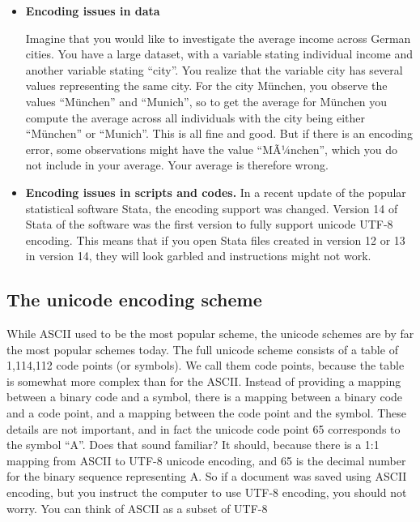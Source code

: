 \documentclass[
]{book}
\begin{document}
\begin{itemize}
\item
  \textbf{Encoding issues in data}

  Imagine that you would like to investigate the average income across German cities. You have a large dataset, with a variable stating individual income and another variable stating ``city''. You realize that the variable city has several values representing the same city. For the city München, you observe the values ``München'' and ``Munich'', so to get the average for München you compute the average across all individuals with the city being either ``München'' or ``Munich''. This is all fine and good. But if there is an encoding error, some observations might have the value ``MÃ¼nchen'', which you do not include in your average. Your average is therefore wrong.
\item
  \textbf{Encoding issues in scripts and codes.}
  In a recent update of the popular statistical software Stata, the encoding support was changed. Version 14 of Stata of the software was the first version to fully support unicode UTF-8 encoding. This means that if you open Stata files created in version 12 or 13 in version 14, they will look garbled and instructions might not work.
\end{itemize}

\hypertarget{the-unicode-encoding-scheme}{%
\subsection*{The unicode encoding scheme}\label{the-unicode-encoding-scheme}}

While ASCII used to be the most popular scheme, the unicode schemes are by far the most popular schemes today. The full unicode scheme consists of a table of 1,114,112 code points (or symbols). We call them code points, because the table is somewhat more complex than for the ASCII. Instead of providing a mapping between a binary code and a symbol, there is a mapping between a binary code and a code point, and a mapping between the code point and the symbol. These details are not important, and in fact the unicode code point 65 corresponds to the symbol ``A''. Does that sound familiar? It should, because there is a 1:1 mapping from ASCII to UTF-8 unicode encoding, and 65 is the decimal number for the binary sequence representing A. So if a document was saved using ASCII encoding, but you instruct the computer to use UTF-8 encoding, you should not worry. You can think of ASCII as a subset of UTF-8
\end{document}
